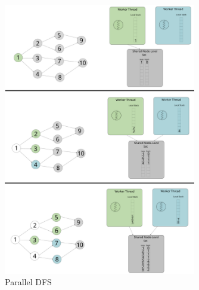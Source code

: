 \begin{figure}[ht]
    \centering
    \includegraphics[width=0.75\textwidth]{figures/parallelDFS.png}
    \caption{Parallel DFS}
    \label{fig:parallelDFS}
\end{figure}
